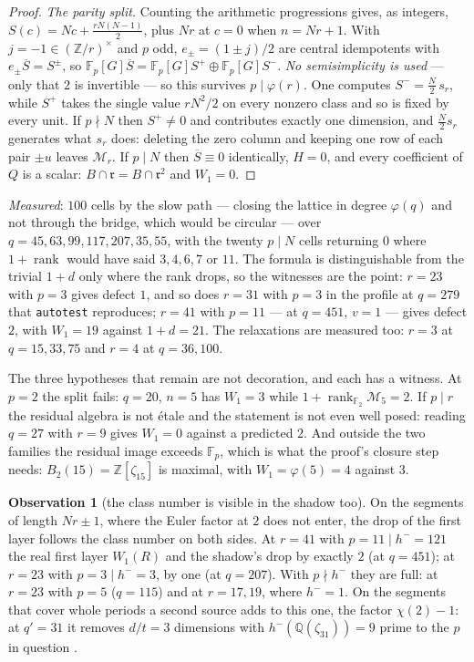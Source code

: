 \documentclass[11pt,a4paper]{article}
\theoremstyle{definition}
\newtheorem{observation}[theorem]{Observation}
\newcommand{\ZZ}{\mathbb{Z}}
\newcommand{\QQ}{\mathbb{Q}}
\newcommand{\FF}{\mathbb{F}}
\newcommand{\rad}{\mathfrak{r}}
\newcommand{\medido}[1]{\emph{Measured}: #1}
\begin{document}
\begin{proof}
\emph{The parity split.} Counting the arithmetic progressions gives, as integers,
$S(c)=Nc+\tfrac{rN(N-1)}2$, plus $Nr$ at $c=0$ when $n=Nr+1$. With $j=-1\in(\ZZ/r)^\times$ and
$p$ odd, $e_\pm=(1\pm j)/2$ are central idempotents with $e_\pm\overline S=S^\pm$, so
$\FF_p[G]\overline S=\FF_p[G]S^+\oplus\FF_p[G]S^-$. \emph{No semisimplicity is used} --- only that
$2$ is invertible --- so this survives $p\mid\varphi(r)$. One computes $S^-=\tfrac N2\,s_r$, while
$S^+$ takes the single value $rN^2/2$ on every nonzero class and so is fixed by every unit. If
$p\nmid N$ then $S^+\ne0$ and contributes exactly one dimension, and $\tfrac N2s_r$ generates what
$s_r$ does: deleting the zero column and keeping one row of each pair $\pm u$ leaves
$\mathcal M_r$. If $p\mid N$ then $\overline S\equiv0$ identically, $H=0$, and every coefficient of
$Q$ is a scalar: $B\cap\rad=B\cap\rad^2$ and $W_1=0$.
\end{proof}

\medido{$100$ cells by the slow path --- closing the lattice in degree $\varphi(q)$ and not through
the bridge, which would be circular --- over $q=45,63,99,117,207,35,55$, with the twenty $p\mid N$
cells returning $0$ where $1+\operatorname{rank}$ would have said $3,4,6,7$ or $11$. The formula is
distinguishable from the trivial $1+d$ only where the rank drops, so the witnesses are the point:
$r=23$ with $p=3$ gives defect $1$, and so does $r=31$ with $p=3$ in the profile at $q=279$ that
\texttt{autotest} reproduces; $r=41$ with $p=11$ --- at $q=451$, $v=1$ --- gives defect $2$, with $W_1=19$ against $1+d=21$. The relaxations are measured too:
$r=3$ at $q=15,33,75$ and $r=4$ at $q=36,100$.}

The three hypotheses that remain are not decoration, and each has a witness. At $p=2$ the split
fails: $q=20$, $n=5$ has $W_1=3$ while $1+\operatorname{rank}_{\FF_2}\mathcal M_5=2$. If $p\mid r$
the residual algebra is not \'etale and the statement is not even well posed: reading $q=27$ with
$r=9$ gives $W_1=0$ against a predicted $2$. And outside the two families the residual image
exceeds $\FF_p$, which is what the proof's closure step needs: $B_2(15)=\ZZ[\zeta_{15}]$ is
maximal, with $W_1=\varphi(5)=4$ against $3$.

\begin{observation}[the class number is visible in the shadow too]
On the segments of length $Nr\pm1$, where the Euler factor at $2$ does not enter, the drop of the
first layer follows the class number on both sides. At $r=41$ with $p=11\mid h^-=121$ the real
first layer $W_1(R)$ and the shadow's drop by exactly $2$ (at $q=451$); at $r=23$ with
$p=3\mid h^-=3$, by one (at $q=207$). With $p\nmid h^-$ they are full: at $r=23$ with $p=5$
($q=115$) and at $r=17,19$, where $h^-=1$. On the segments that cover whole periods a second
source adds to this one, the factor $\chi(2)-1$: at $q'=31$ it removes $d/t=3$ dimensions with
$h^-(\QQ(\zeta_{31}))=9$ prime to the $p$ in question \cite{II}.
\end{observation}
\end{document}
